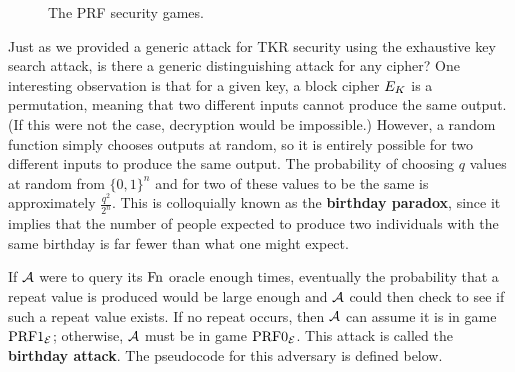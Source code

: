 \begin{figure}
	\centering
\caption{The PRF security games.}
\label{fig:prf}
\end{figure} 

Just as we provided a generic attack for TKR security using the exhaustive key search attack, is there a generic distinguishing attack for any cipher? One interesting observation is that for a given key, a block cipher $E_K$ is a permutation, meaning that two different inputs cannot produce the same output. (If this were not the case, decryption would be impossible.) However, a random function simply chooses outputs at random, so it is entirely possible for two different inputs to produce the same output. The probability of choosing $q$ values at random from $\{0,1\}^n$ and for two of these values to be the same is approximately $\frac{q^2}{2^n}$. This is colloquially known as the \textbf{birthday paradox}, since it implies that the number of people expected to produce two individuals with the same birthday is far fewer than what one might expect. 

If ${\mathcal A}$ were to query its $\textnormal{Fn}$ oracle enough times, eventually the probability that a repeat value is produced would be large enough and ${\mathcal A}$ could then check to see if such a repeat value exists. If no repeat occurs, then ${\mathcal A}$ can assume it is in game $\textnormal{PRF}1_{{\cal E}}$; otherwise, ${\mathcal A}$ must be in game $\textnormal{PRF}0_{{\cal E}}$. This attack is called the \textbf{birthday attack}. The pseudocode for this adversary is defined below.
 
\begin{center}
\end{center}

